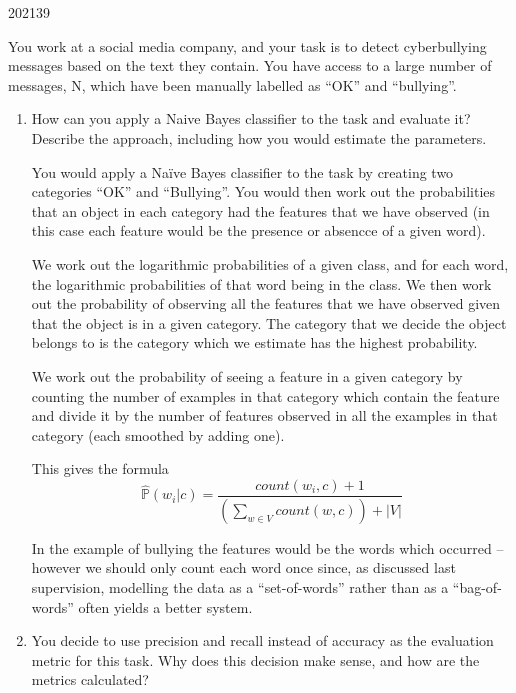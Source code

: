 \documentclass[10pt,\jkfside,a4paper]{article}
\begin{document}
\begin{examquestion}{2021}{3}{9}

You work at a social media company, and your task is to detect cyberbullying
messages based on the text they contain. You have access to a large number of
messages, N, which have been manually labelled as “OK” and “bullying”.

\begin{enumerate}

\item How can you apply a Naive Bayes classifier to the task and evaluate it? Describe
the approach, including how you would estimate the parameters.

You would apply a Na\"ive Bayes classifier to the task by creating two categories 
``OK'' and ``Bullying''. You would then work out the probabilities that an object 
in each category had the features that we have observed (in this case each feature would 
be the presence or absencce of a given word).

We work out the logarithmic probabilities of a given class, and for each word, the logarithmic 
probabilities of that word being in the class. We then work out the probability of observing all 
the features that we have observed given that the object is in a given category. The category 
that we decide the object belongs to is the category which we estimate has the highest probability.

We work out the probability of seeing a feature in a given category by counting the number 
of examples in that category which contain the feature and divide it by the number of features observed 
in all the examples in that category (each smoothed by adding one).

This gives the formula
\begin{equation}
\hat{\mathds{P}}(w_i|c) = \frac{count(w_i, c) + 1}{(\sum_{w \in V} count(w, c)) + |V|}
\end{equation}

In the example of bullying the features would be the words which occurred -- however we 
should only count each word once since, as discussed last supervision, modelling the 
data as a ``set-of-words'' rather than as a ``bag-of-words'' often yields a better system.

\item You decide to use precision and recall instead of accuracy as the evaluation
metric for this task. Why does this decision make sense, and how are the metrics
calculated?


\end{enumerate}
\end{examquestion}
\end{document}
